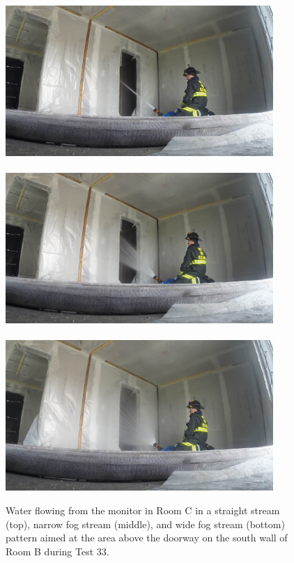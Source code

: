 \documentclass[12pt,oneside]{book}
\begin{document}
\begin{figure}[!ht]
	\includegraphics[trim=16cm 6.25cm 9cm 6cm, clip=true, width=4in]{../Figures/Pictures/SS_Room_B_Test_33}
	\\~\\
	\includegraphics[trim=16cm 6.25cm 9cm 6cm, clip=true, width=4in]{../Figures/Pictures/NF_Room_B_Test_33}
	\\~\\
	\includegraphics[trim=16cm 6.25cm 9cm 6cm, clip=true, width=4in]{../Figures/Pictures/WF_Room_B_Test_33}
	\caption[Straight stream, narrow fog stream, and wide fog stream during Test 33.]{Water flowing from the monitor in Room C in a straight stream (top), narrow fog stream (middle), and wide fog stream (bottom) pattern aimed at the area above the doorway on the south wall of Room B during Test 33.}
	\label{fig:test_33_pic}
\end{figure}
\end{document}
